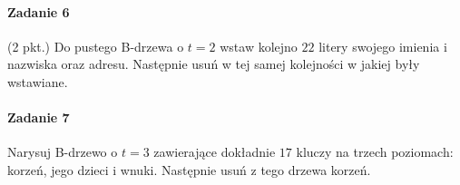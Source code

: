 \documentclass[18pt]{extarticle}
\begin{document}
\paragraph{Zadanie 6} (2 pkt.) Do pustego B-drzewa o $t=2$ wstaw kolejno $22$ litery swojego imienia i nazwiska oraz adresu. Następnie usuń w tej samej kolejności w jakiej były wstawiane.

\paragraph{Zadanie 7} Narysuj B-drzewo o $t=3$ zawierające dokładnie $17$ kluczy na trzech poziomach: korzeń, jego dzieci i wnuki. Następnie usuń z tego drzewa korzeń.
\end{document}
